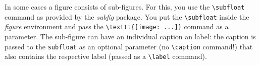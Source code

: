 In some cases a figure consists of sub-figures.
For this, you use the \verb+\subfloat+ command as provided by the \emph{subfig}
package.
You put the \verb+\subfloat+ inside the \emph{figure} environment and pass the
\verb+\texttt{[image: ...]}+ command as a parameter.
The sub-figure can have an individual caption an label: the caption is passed
to the \verb+subfloat+ as an optional parameter (no \verb+\caption+ command!)
that also contains the respective label (passed as a \verb+\label+ command).
